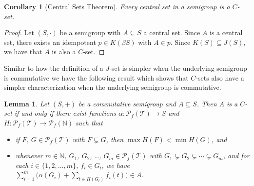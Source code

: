 \documentclass[12pt]{article}
\theoremstyle{plain}
\newtheorem{lem}[thm]{Lemma}
\newtheorem{cor}[thm]{Corollary}
\theoremstyle{definition}
\newcommand{\bbN}{\mathbb{N}}
\newcommand{\calT}{\mathcal{T}}
\newcommand{\Pf}{\mathcal{P}_f}
\begin{document}
\begin{cor}[Central Sets Theorem]
  Every central set in a semigroup is a $C$-set.
\end{cor}
\begin{proof}
  Let $(S, \cdot)$ be a semigroup with $A \subseteq S$ a central set. 
  Since $A$ is a central set, there exists an idempotent $p \in K(\beta S)$ with $A \in p$.
  Since $K(S) \subseteq J(S)$, we have that $A$ is also a $C$-set.
\end{proof}

Similar to how the definition of a $J$-set is simpler when the underlying semigroup is commutative we have the following result which shows that $C$-sets also have a simpler characterization when the underlying semigroup is commutative. 

\begin{lem}
  Let $(S, +)$ be a commutative semigroup and $A \subseteq S$.
  Then $A$ is a $C$-set if and only if there exist functions $\alpha \colon \Pf(\calT) \to S$ and $H \colon \Pf(\calT) \to \Pf(\bbN)$ such that
  \begin{itemize}
    \item[(1)] if $F$, $G \in \Pf(\calT)$ with $F \subsetneq G$, then $\max H(F) < \min H(G)$, and
    
    \item[(2)] whenever $m \in \bbN$, $G_1$, $G_2$, \dots, $G_m \in \Pf(\calT)$ with $G_1 \subsetneq G_2 \subsetneq \cdots \subsetneq G_m$, and for each $i \in \{1, 2, \ldots, m\}$, $f_i \in G_i$, we have $\sum_{i=1}^m\bigl( \alpha(G_i) + \sum_{t \in H(G_i)} f_i(t)\bigr) \in A$.
  \end{itemize}
\end{lem}
\end{document}
